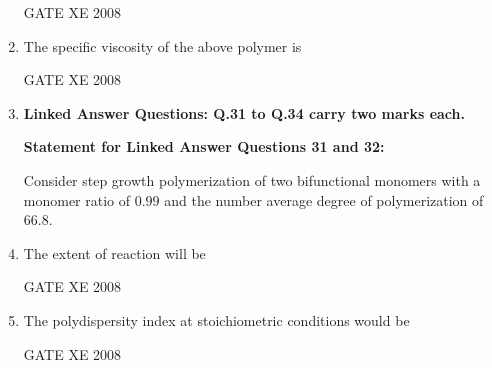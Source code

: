 \documentclass[12pt]{article}
\begin{document}
\begin{enumerate}[label=Q\arabic*.]
GATE XE 2008

\item The specific viscosity of the above polymer is 

\begin{enumerate}[label=(\Alph*)]
\end{enumerate}

GATE XE 2008



\item[] \textbf{\Large Linked Answer Questions: Q.31 to Q.34 carry two marks each.}

\textbf{Statement for Linked Answer Questions 31 and 32:}  

 Consider step growth polymerization of two bifunctional monomers with a monomer ratio of $0.99$ and the number average degree of polymerization of $66.8$.

\item The extent of reaction will be  

\begin{enumerate}[label=(\Alph*)]
\end{enumerate}

GATE XE 2008

\item The polydispersity index at stoichiometric conditions would be  

\begin{enumerate}[label=(\Alph*)]
\end{enumerate}

GATE XE 2008



\end{enumerate}
\end{document}
